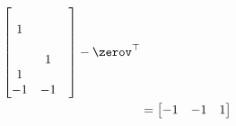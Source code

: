 \documentclass{ctexart}
\begin{document}
\begin{example} 
\begin{align*}
\begin{bmatrix}
                                                              &    &   \\
                                                           1  &    &   \\
                                                              &    &   \\
                                                              & 1  &   \\
                                                           1  &    &   \\
                                                           -1 & -1 &   \\
                                                       \end{bmatrix} - \zerov^\top \\
                       & = \begin{bmatrix}
                               -1 & -1 & 1
                           \end{bmatrix}
    \end{align*}


\end{example}
\end{document}
